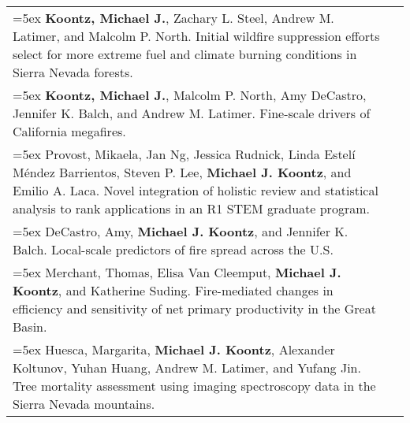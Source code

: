 \begin{longtable}{@{} >{\raggedright}p{5.25in} >{\raggedleft}X @{}}

\hangindent=5ex \textbf{Koontz, Michael J.}, Zachary L. Steel, Andrew M. Latimer, and Malcolm P. North. Initial wildfire suppression efforts select for more extreme fuel and climate burning conditions in Sierra Nevada forests.  & [\textcolor{blue}{\href{https://github.com/mikoontz/selection-by-suppression}{GitHub}}] \tabularnewline

\hangindent=5ex \textbf{Koontz, Michael J.}, Malcolm P. North, Amy DeCastro, Jennifer K. Balch, and Andrew M. Latimer. Fine-scale drivers of California megafires.  & [\textcolor{blue}{\href{https://github.com/mikoontz/megafire-fine-scale-drivers}{GitHub}}] \tabularnewline

\hangindent=5ex Provost, Mikaela, Jan Ng, Jessica Rudnick, Linda Estel\'i M\'endez Barrientos, Steven P. Lee, \textbf{Michael J. Koontz}, and Emilio A. Laca. Novel integration of holistic review and statistical analysis to rank applications in an R1 STEM graduate program. & \tabularnewline

\hangindent=5ex DeCastro, Amy, \textbf{Michael J. Koontz}, and Jennifer K. Balch. Local-scale predictors of fire spread across the U.S. & \tabularnewline

\hangindent=5ex Merchant, Thomas, Elisa Van Cleemput, \textbf{Michael J. Koontz}, and Katherine Suding. Fire-mediated changes in efficiency and sensitivity of net primary productivity in the Great Basin. & \tabularnewline

\hangindent=5ex Huesca, Margarita, \textbf{Michael J. Koontz}, Alexander Koltunov, Yuhan Huang, Andrew M. Latimer, and Yufang Jin. Tree mortality assessment using imaging spectroscopy data in the Sierra Nevada mountains. & \tabularnewline


\end{longtable}




